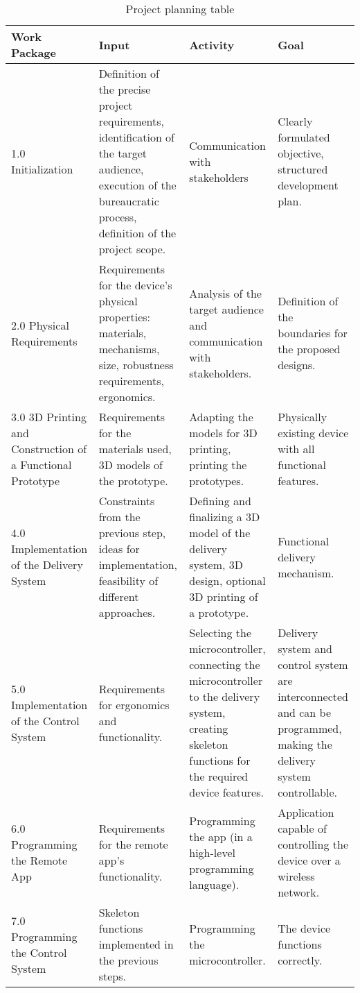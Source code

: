 \newpage
\begin{table}[h!]
	\centering
	\small
	\begin{tabular}{|p{3cm}|p{4cm}|p{4cm}|p{4cm}|}
	\hline
	\textbf{Work Package} & \textbf{Input} & \textbf{Activity} & \textbf{Goal} \\
	\hline
	1.0 Initialization & Definition of the precise project requirements, identification of the target audience, execution of the bureaucratic process, definition of the project scope. & Communication with stakeholders & Clearly formulated objective, structured development plan. \\
	\hline
	2.0 Physical Requirements & Requirements for the device's physical properties: materials, mechanisms, size, robustness requirements, ergonomics. & Analysis of the target audience and communication with stakeholders. & Definition of the boundaries for the proposed designs. \\
	\hline
	3.0 3D Printing and Construction of a Functional Prototype & Requirements for the materials used, 3D models of the prototype. & Adapting the models for 3D printing, printing the prototypes. & Physically existing device with all functional features. \\
	\hline
	4.0 Implementation of the Delivery System & Constraints from the previous step, ideas for implementation, feasibility of different approaches. & Defining and finalizing a 3D model of the delivery system, 3D design, optional 3D printing of a prototype. & Functional delivery mechanism. \\
	\hline
	5.0 Implementation of the Control System & Requirements for ergonomics and functionality. & Selecting the microcontroller, connecting the microcontroller to the delivery system, creating skeleton functions for the required device features. & Delivery system and control system are interconnected and can be programmed, making the delivery system controllable. \\
	\hline
	6.0 Programming the Remote App & Requirements for the remote app's functionality. & Programming the app (in a high-level programming language). & Application capable of controlling the device over a wireless network. \\
	\hline
	7.0 Programming the Control System & Skeleton functions implemented in the previous steps. & Programming the microcontroller. & The device functions correctly. \\
	\hline
\end{tabular}
	\caption{Project planning table}
	\label{tab:projektplanung}
\end{table}
\newpage
